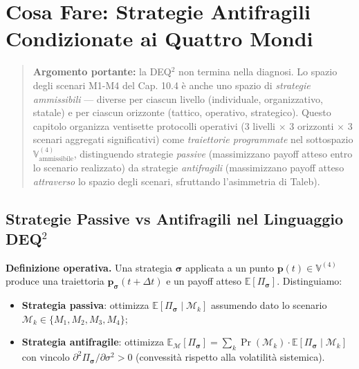 \chapter{Cosa Fare: Strategie Antifragili Condizionate ai Quattro
Mondi}\label{cosa-fare-strategie-antifragili-condizionate-ai-quattro-mondi}

\begin{quote}
\textbf{Argomento portante:} la DEQ$^2$ non termina nella diagnosi. Lo
spazio degli scenari M1-M4 del Cap. 10.4 è anche uno spazio di
\emph{strategie ammissibili} --- diverse per ciascun livello
(individuale, organizzativo, statale) e per ciascun orizzonte (tattico,
operativo, strategico). Questo capitolo organizza ventisette protocolli
operativi (3 livelli $\times$ 3 orizzonti $\times$ 3 scenari aggregati significativi)
come \emph{traiettorie programmate} nel sottospazio
\(\mathbb{V}^{(4)}_{\text{ammissibile}}\), distinguendo strategie
\emph{passive} (massimizzano payoff atteso entro lo scenario realizzato)
da strategie \emph{antifragili} (massimizzano payoff atteso
\emph{attraverso} lo spazio degli scenari, sfruttando l'asimmetria di
Taleb).
\end{quote}



\section{Strategie Passive vs Antifragili nel Linguaggio
DEQ$^2$}\label{strategie-passive-vs-antifragili-nel-linguaggio-dequxb2}

\Hypoth{} \textbf{Definizione operativa.} Una strategia
\(\boldsymbol{\sigma}\) applicata a un punto
\(\boldsymbol{p}(t) \in \mathbb{V}^{(4)}\) produce una traiettoria
\(\boldsymbol{p}_{\boldsymbol{\sigma}}(t+\Delta t)\) e un payoff atteso
\(\mathbb{E}[\Pi_{\boldsymbol{\sigma}}]\). Distinguiamo:

\begin{itemize}
\tightlist
\item
  \textbf{Strategia passiva}: ottimizza
  \(\mathbb{E}[\Pi_{\boldsymbol{\sigma}} \mid \mathcal{M}_k]\) assumendo
  dato lo scenario \(\mathcal{M}_k \in \{M_1, M_2, M_3, M_4\}\);
\item
  \textbf{Strategia antifragile}: ottimizza
  \(\mathbb{E}_{\mathcal{M}}[\Pi_{\boldsymbol{\sigma}}] = \sum_k \Pr(\mathcal{M}_k) \cdot \mathbb{E}[\Pi_{\boldsymbol{\sigma}} \mid \mathcal{M}_k]\)
  con vincolo
  \(\partial^2 \Pi_{\boldsymbol{\sigma}} / \partial \sigma^2 > 0\)
  (convessità rispetto alla volatilità sistemica).
\end{itemize}

